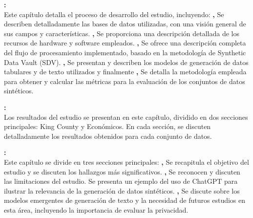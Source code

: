 \textbf{:}  \\
Este capítulo detalla el proceso de desarrollo del estudio, incluyendo: 
\textbf{,} Se describen detalladamente las bases de datos utilizadas, con una visión general de sus campos y características. 
\textbf{,} Se proporciona una descripción detallada de los recursos de hardware y software empleados. 
\textbf{,} Se ofrece una descripción completa del flujo de procesamiento implementado, basado en la metodología de Synthetic Data Vault (SDV). 
\textbf{,} Se presentan y describen los modelos de generación de datos tabulares y de texto utilizados y finalmente
\textbf{,} Se detalla la metodología empleada para obtener y calcular las métricas para la evaluación de los conjuntos de datos sintéticos.

\textbf{:} \\
Los resultados del estudio se presentan en este capítulo, dividido en dos secciones principales: King County y Económicos. En cada sección, se discuten detalladamente los resultados obtenidos para cada conjunto de datos.

\textbf{:} \\
Este capítulo se divide en tres secciones principales: \textbf{,}
Se recapitula el objetivo del estudio y se discuten los hallazgos más significativos.
\textbf{,}
Se reconocen y discuten las limitaciones del estudio.
Se presenta un ejemplo del uso de ChatGPT para ilustrar la relevancia de la generación de datos sintéticos.
\textbf{,}
Se discute sobre los modelos emergentes de generación de texto y la necesidad de futuros estudios en esta área, incluyendo la importancia de evaluar la privacidad.
